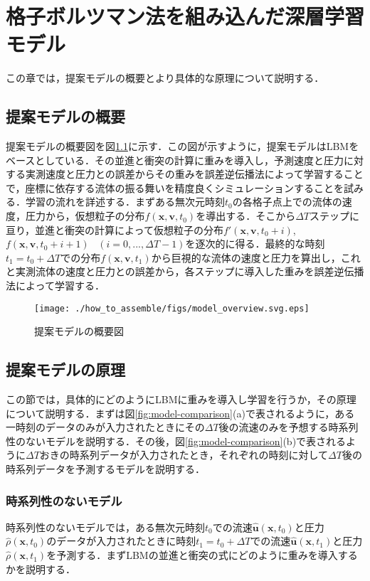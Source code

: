 \chapter{格子ボルツマン法を組み込んだ深層学習モデル\label{chap:how-to-assemble}}
この章では，提案モデルの概要とより具体的な原理について説明する．

\section{提案モデルの概要}
提案モデルの概要図を図\ref{fig:overview}に示す．この図が示すように，提案モデルはLBMをベースとしている．その並進と衝突の計算に重みを導入し，予測速度と圧力に対する実測速度と圧力との誤差からその重みを誤差逆伝播法によって学習することで，座標に依存する流体の振る舞いを精度良くシミュレーションすることを試みる．学習の流れを詳述する．まずある無次元時刻$t_0$の各格子点上での流体の速度，圧力から，仮想粒子の分布$f(\bm{x}, \bm{v}, t_0)$を導出する．そこから$\Delta T$ステップに亘り，並進と衝突の計算によって仮想粒子の分布$f'(\bm{x}, \bm{v}, t_0+i)$, $f(\bm{x}, \bm{v}, t_0+i+1) \hspace{10pt}(i=0,...,\Delta T - 1)$を逐次的に得る．最終的な時刻$t_1 = t_0 + \Delta T$での分布$f(\bm{x}, \bm{v}, t_1)$から巨視的な流体の速度と圧力を算出し，これと実測流体の速度と圧力との誤差から，各ステップに導入した重みを誤差逆伝播法によって学習する．
\begin{figure}[btp]
  \centering
  \texttt{[image: ./how\_to\_assemble/figs/model\_overview.svg.eps]}
  \caption{提案モデルの概要図}
  \label{fig:overview}
\end{figure}

\section{提案モデルの原理}
この節では，具体的にどのようにLBMに重みを導入し学習を行うか，その原理について説明する．まずは図\ref{fig:model-comparison}(a)で表されるように，ある一時刻のデータのみが入力されたときにその$\Delta T$後の流速のみを予想する時系列性のないモデルを説明する．その後，図\ref{fig:model-comparison}(b)で表されるように$\Delta T$おきの時系列データが入力されたとき，それぞれの時刻に対して$\Delta T$後の時系列データを予測するモデルを説明する．

\subsection{時系列性のないモデル\label{subsection:time-series-less-model}}
時系列性のないモデルでは，ある無次元時刻$t_0$での流速$\hat{\bm{u}}(\bm{x}, t_0)$と圧力$\hat{\rho}(\bm{x}, t_0)$のデータが入力されたときに時刻$t_1 = t_0 + \Delta T$での流速$\hat{\bm{u}}(\bm{x}, t_1)$と圧力$\hat{\rho}(\bm{x}, t_1)$を予測する．まずLBMの並進と衝突の式にどのように重みを導入するかを説明する．

